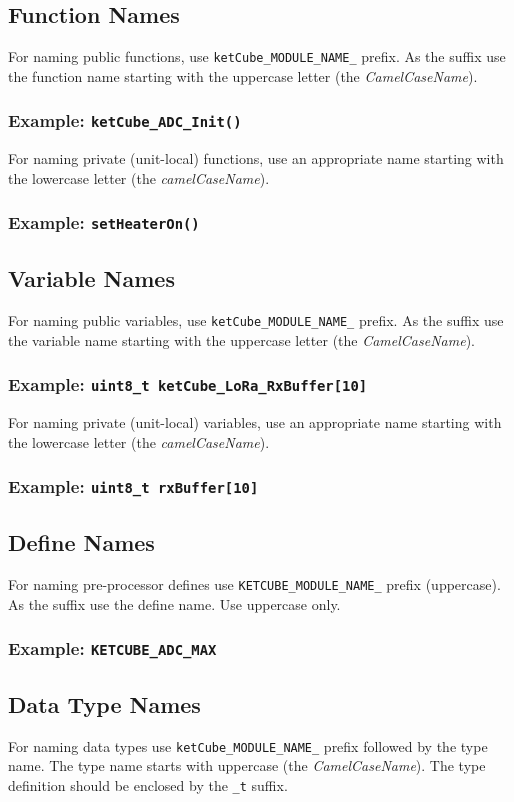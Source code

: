 \documentclass[twoside,a4paper]{refart}
\begin{document}
\subsection*{Function Names}
For naming public functions, use {\tt ketCube\_MODULE\_NAME\_} prefix. As the suffix use the function name starting with the uppercase letter (the {\it CamelCaseName}).
\subsubsection*{Example: {\tt ketCube\_ADC\_Init()}}

For naming private (unit-local) functions, use an appropriate name starting with the lowercase letter (the {\it camelCaseName}).
\subsubsection*{Example: {\tt setHeaterOn()}}

\subsection*{Variable Names}
For naming public variables, use {\tt ketCube\_MODULE\_NAME\_}  prefix. As the suffix use the variable name starting with the uppercase letter (the {\it CamelCaseName}).
\subsubsection*{Example: {\tt uint8\_t ketCube\_LoRa\_RxBuffer[10]}}

For naming private (unit-local) variables, use an appropriate name starting with the lowercase letter (the {\it camelCaseName}).
\subsubsection*{Example: {\tt uint8\_t rxBuffer[10]}}

\subsection*{Define Names}
For naming pre-processor defines use {\tt KETCUBE\_MODULE\_NAME\_} prefix (uppercase). As the suffix use the define name. Use uppercase only.
\subsubsection*{Example: {\tt KETCUBE\_ADC\_MAX}}

\clearpage
\subsection*{Data Type Names}
For naming data types use {\tt ketCube\_MODULE\_NAME\_} prefix followed by the type name. The type name starts with uppercase (the {\it CamelCaseName}). The type definition should be enclosed by the {\tt \_t} suffix.
\end{document}
